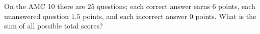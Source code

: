 On the AMC 10 there are $25$ questions; each correct answer earns $6$ points, each unanswered question $1.5$ points, and each incorrect answer $0$ points. What is the sum of all possible total scores?
